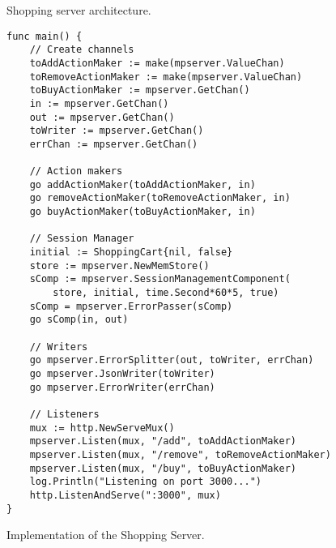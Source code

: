 \begin{figure}[h]
\centering
{}
\caption[scale=1.0]{Shopping server architecture.}
\label{fig:shoppingDesign}
\end{figure}

\newpage
\begin{figure}[h]
\begin{lstlisting}
func main() {
    // Create channels
    toAddActionMaker := make(mpserver.ValueChan)
    toRemoveActionMaker := make(mpserver.ValueChan)
    toBuyActionMaker := mpserver.GetChan()
    in := mpserver.GetChan()
    out := mpserver.GetChan()
    toWriter := mpserver.GetChan()
    errChan := mpserver.GetChan()

    // Action makers
    go addActionMaker(toAddActionMaker, in)
    go removeActionMaker(toRemoveActionMaker, in)
    go buyActionMaker(toBuyActionMaker, in)

    // Session Manager
    initial := ShoppingCart{nil, false}
    store := mpserver.NewMemStore()
    sComp := mpserver.SessionManagementComponent(
        store, initial, time.Second*60*5, true)
    sComp = mpserver.ErrorPasser(sComp)
    go sComp(in, out)

    // Writers
    go mpserver.ErrorSplitter(out, toWriter, errChan)
    go mpserver.JsonWriter(toWriter)
    go mpserver.ErrorWriter(errChan)

    // Listeners
    mux := http.NewServeMux()
    mpserver.Listen(mux, "/add", toAddActionMaker)
    mpserver.Listen(mux, "/remove", toRemoveActionMaker)
    mpserver.Listen(mux, "/buy", toBuyActionMaker)
    log.Println("Listening on port 3000...")
    http.ListenAndServe(":3000", mux)
}
\end{lstlisting}
\caption[scale=1.0]{Implementation of the Shopping Server.}
\label{fig:shoppingCode}
\end{figure}